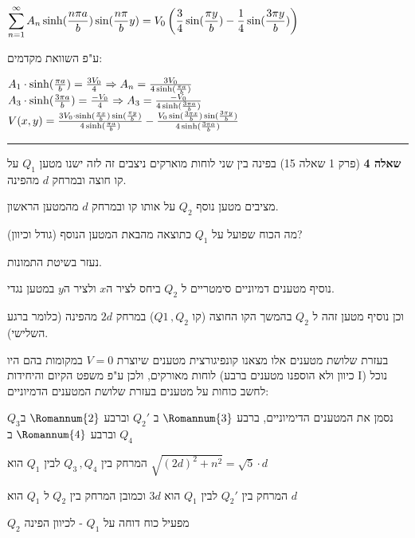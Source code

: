 \documentclass[14pt]{extarticle}
\makeatletter
\newenvironment{lefteqs}{%
    \begin{english}%
    \begin{flushleft}%
    \renewcommand{\arraystretch}{1.3}%
    $\begin{array}{@{}l@{}}%
}{%
    \end{array}$%
    \end{flushleft}%
    \end{english}%
}
\makeatother
\begin{document}
\begin{lefteqs}
    \displaystyle \sum_{n=1}^{\infty} A_n \sinh(\frac{n\pi a}{b}) \sin(\frac{n\pi}{b}y) =
    V_0\left( \frac{3}{4}\sin(\frac{\pi y}{b}) -  \frac{1}{4} \sin(\frac{3\pi y}{b})\right ) \\
\end{lefteqs}
ע"פ השוואת מקדמים:
\begin{lefteqs}
    A_1 \cdot \sinh(\frac{\pi a}{b}) = \frac{3V_0}{4} \Rightarrow A_n=\frac{3V_0}{4\sinh(\frac{\pi a}{b})} \\
    A_3 \cdot \sinh(\frac{3\pi a}{b}) = \frac{-V_0}{4} \Rightarrow A_3 = \frac{-V_0}{4\sinh(\frac{3\pi a}{b})} \\
    V(x,y) = \frac{3V_0 \cdot \sinh(\frac{\pi x}{b}) \sin(\frac{\pi y}{b})}{4\sinh(\frac{\pi a}{b})}
    - \frac{V_0\sin(\frac{3\pi x}{b})\sin({\frac{3\pi y}{b}})}{4\sinh(\frac{3\pi a}{b})}

\end{lefteqs}

\vspace{3em}
\hrule
\vspace{2em}

\textbf{\large שאלה 4}
(פרק 1 שאלה 15)
בפינה בין שני לוחות מוארקים ניצבים זה לזה ישנו מטען $Q_1$ על קו חוצה ובמרחק $d$ מהפינה.

מציבים מטען נוסף $Q_2$ על אותו קו ובמרחק $d$ מהמטען הראשון.

מה הכוח שפועל על $Q_1$ כתוצאה מהבאת המטען הנוסף (גודל וכיוון)?

נעזר בשיטת התמונות.

נוסיף מטענים דמיוניים סימטריים ל $Q_2$ ביחס לציר ה$x$ ולציר ה$y$ במטען נגדי.

וכן נוסיף מטען זהה ל $Q_2$ בהמשך הקו החוצה (קו $Q1 \, ,Q_2$) במרחק $2d$ מהפינה (כלומר ברגע השלישי).

בעזרת שלושת מטענים אלו מצאנו קונפיגורצית מטענים שיוצרת $V=0$ במקומות בהם היו לוחות מאורקים, ולכן ע"פ משפט
הקיום והיחידות (כיוון ולא הוספנו מטענים ברבע I) נוכל לחשב כוחות על מטענים בעזרת שלושת המטענים הדמיוניים:

נסמן את המטענים הדימיוניים, ברבע $\Romannum{3}$ ב $Q_2'$ וברבע $\Romannum{2}$ ב$Q_3$ וברבע $\Romannum{4}$ ב $Q_4$

המרחק בין $Q_3 \, , Q_4$ לבין $Q_1$ הוא $\sqrt{(2d)^2 + n^2} = \sqrt{5}\cdot d$

המרחק בין $Q_2'$ לבין $Q_1$ הוא $3d$ וכמובן המרחק בין $Q_2$ ל $Q_1$ הוא $d$

$Q_2$ מפעיל כוח דוחה על $Q_1$ - לכיוון הפינה
\end{document}
